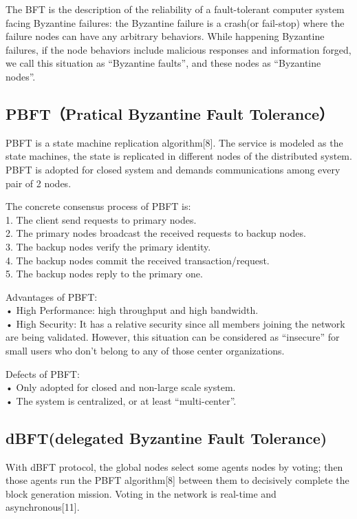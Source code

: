 \documentclass[doublespacing]{bmcart}
\begin{document}
\begin{CJK*}{UTF8}{gbsn}
	The BFT is the description of the reliability of a fault-tolerant computer system facing Byzantine failures: the Byzantine failure is a crash(or fail-stop) where the failure nodes can have any arbitrary behaviors.
	While happening Byzantine failures, if the node behaviors include malicious responses and information forged, we call this situation as ``Byzantine faults'', and these nodes as ``Byzantine nodes''.
	
\subsection{PBFT（Pratical Byzantine Fault Tolerance）}
	 
	PBFT is a state machine replication algorithm[8]. The service is modeled as the state machines, the state is replicated in different nodes of the distributed system. PBFT is adopted for closed system and demands communications among every pair of 2 nodes.
	 
	The concrete consensus process of PBFT is:
\\1. The client send requests to primary nodes.
\\2. The primary nodes broadcast the received requests to backup nodes.
\\3. The backup nodes verify the primary identity.
\\4. The backup nodes commit the received transaction/request.
\\5. The backup nodes reply to the primary one.
	
 
Advantages of PBFT:
\\• High Performance: high throughput and high bandwidth.
\\• High Security: It has a relative security since all members joining the network are being validated. However, this situation can be considered as ``insecure'' for small users who don't belong to any of those center organizations.
	 
Defects of PBFT:	
\\• Only adopted for closed and non-large scale system.
\\• The system is centralized, or at least ``multi-center''.
	
	\subsection{dBFT(delegated Byzantine Fault Tolerance)}
	 
	With dBFT protocol, the global nodes select some agents nodes by voting; then those agents run the PBFT algorithm[8] between them to decisively complete the block generation mission. Voting in the network is real-time and asynchronous[11].
	

\end{CJK*}
\end{document}

